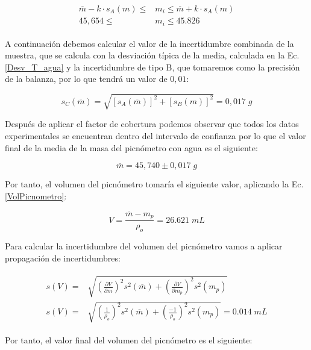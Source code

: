 \documentclass[a4paper,12pt,titlepage]{article}
\begin{document}
\begin{align}
    \begin{split}
        \overline{m} - k \cdot s_{A}(m) \leq &m_{i} \leq \overline{m} + k \cdot s_{A}(m) \\
        45,654 \leq &m_{i} \leq 45.826
    \end{split}
\end{align}

A continuación debemos calcular el valor de la incertidumbre combinada de la muestra, que se calcula con la desviación típica de la media, calculada en la Ec.\ref{Desv_T_agua} y la incertidumbre de tipo B, que tomaremos como la precisión de la balanza, por lo que tendrá un valor de $0,01$:

\begin{equation}
    s_{C}(\overline{m}) = \sqrt{[s_{A}(\overline{m})]^2+[s_{B}(m)]^2} = 0,017 \; g
    \label{Inc combinada}
\end{equation}

Después de aplicar el factor de cobertura podemos observar que todos los datos experimentales se encuentran dentro del intervalo de confianza por lo que el valor final de la media de la masa del picnómetro con agua es el siguiente:

\begin{equation}
    \overline{m} = 45,740 \pm 0,017 \; g
\end{equation}

Por tanto, el volumen del picnómetro tomaría el siguiente valor, aplicando la Ec.\ref{VolPicnometro}:

\begin{equation}
    V = \frac{\overline{m}-m_{p}}{\rho_{o}}  = 26.621\; mL
\end{equation}

Para calcular la incertidumbre del volumen del picnómetro vamos a aplicar propagación de incertidumbres:

\begin{align}
    \begin{split}
    s(V) = &\sqrt{\left (\frac{\partial V}{\partial \overline{m}}\right )^2 s^2(\overline{m})  + \left (\frac{\partial V}{\partial m_{p}}\right )^2 s^2(m_{p})} \\
    s(V) = &\sqrt{\left (\frac{1}{\rho_{o}}\right )^2 s^2(\overline{m})  + \left (\frac{-1}{\rho_{o}}\right )^2 s^2(m_{p})} = 0.014 \; mL
    \end{split}
\end{align}

Por tanto, el valor final del volumen del picnómetro es el siguiente:
\end{document}
